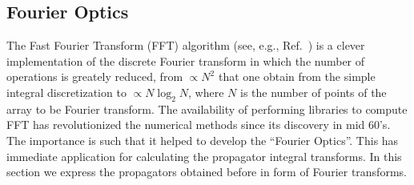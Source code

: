 \documentclass{iucr}              %
\begin{document}
\subsection{Fourier Optics}

The Fast Fourier Transform (FFT) algorithm (see, e.g., Ref.~\cite{10.2307/2003354}) is a clever implementation of the discrete Fourier transform in which the number of operations is greately reduced, from $\propto N^2$ that one obtain from the simple integral discretization to $\propto N \log_2 N$, where $N$ is the number of points of the array to be Fourier transform. The availability of performing libraries to compute FFT has revolutionized the numerical methods since its discovery in mid 60's. The importance is such that it helped to develop the ``Fourier Optics''. This has immediate application for calculating the propagator integral transforms. In this section we express the propagators obtained before in form of Fourier transforms. 
\end{document}

